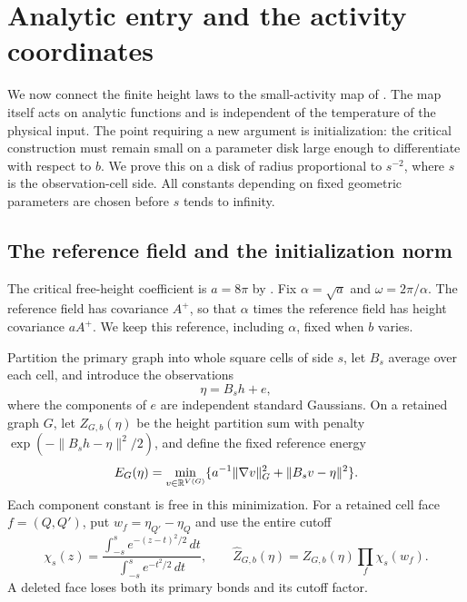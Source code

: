 \section{Analytic entry and the activity coordinates}\label{sec:entry}

We now connect the finite height laws to the small-activity map of
\cite{F}.  The map itself acts on analytic functions and is independent
of the temperature of the physical input.  The point requiring a new
argument is initialization: the critical construction must remain small
on a parameter disk large enough to differentiate with respect to $b$.
We prove this on a disk of radius proportional to $s^{-2}$, where $s$ is
the observation-cell side.  All constants depending on fixed geometric
parameters are chosen before $s$ tends to infinity.

\subsection{The reference field and the initialization norm}

The critical free-height coefficient is $a=8\pi$ by
\cite[Section~6]{X}.  Fix $\alpha=\sqrt a$ and $\omega=2\pi/\alpha$.
The reference field has covariance $A^+$, so that $\alpha$ times the
reference field has height covariance $aA^+$.  We keep this reference,
including $\alpha$, fixed when $b$ varies.

Partition the primary graph into whole square cells of side $s$, let
$B_s$ average over each cell, and introduce the observations
\begin{equation}\label{eq:observations}
                         \eta=B_sh+e,
\end{equation}
where the components of $e$ are independent standard Gaussians.  On a
retained graph $G$, let $Z_{G,b}(\eta)$ be the height partition sum with
penalty $\exp(-\|B_sh-\eta\|^2/2)$, and define the fixed reference energy
\begin{equation}\label{eq:observation-energy}
 E_G(\eta)=\min_{v\in\mathbb R^{V(G)}}
       \{a^{-1}\|\nabla v\|_G^2+\|B_sv-\eta\|^2\}.
\end{equation}
Each component constant is free in this minimization.  For a retained
cell face $f=(Q,Q')$, put $w_f=\eta_{Q'}-\eta_Q$ and use the entire
cutoff
\begin{equation}\label{eq:entry-cutoff}
 \chi_s(z)=
 \frac{\int_{-s}^s e^{-(z-t)^2/2}\,dt}{\int_{-s}^se^{-t^2/2}\,dt},
 \qquad
 \widehat Z_{G,b}(\eta)=Z_{G,b}(\eta)\prod_f\chi_s(w_f).
\end{equation}
A deleted face loses both its primary bonds and its cutoff factor.

